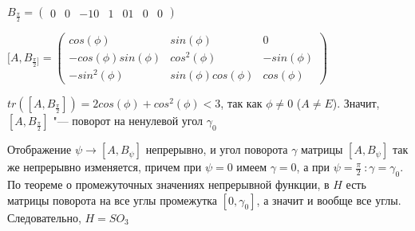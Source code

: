 \documentclass{article}
\begin{document}
$B_{\frac{\pi}{2}} = \begin{pmatrix}
0 & 0 & -1
0 & 1 & 0
1 & 0 & 0
\end{pmatrix}$

$[A, B_{\frac{\pi}{2}]} = \begin{pmatrix}
cos(\phi) & sin(\phi) & 0 \\
-cos(\phi)sin(\phi) & cos^2(\phi) & -sin(\phi) \\
-sin^2(\phi) & sin(\phi)cos(\phi) & cos(\phi)
\end{pmatrix}$

$tr([A, B_{\frac{\pi}{2}}]) = 2cos(\phi) + cos^2(\phi) < 3$, так как $\phi \neq 0$ ($A \neq E$). Значит, $[A, B_{\frac{\pi}{2}}]$ "--- поворот на ненулевой угол $\gamma_0$

Отображение $\psi \rightarrow [A, B_{\psi}]$ непрерывно, и угол поворота $\gamma$ матрицы $[A, B_{\psi}]$ так же непрерывно изменяется, причем при $\psi = 0$ имеем $\gamma = 0$, а при $\psi = \frac{\pi}{2} \ :  \gamma = \gamma_0$. По теореме о промежуточных значениях непрерывной функции, в $H$ есть матрицы поворота на все углы промежутка $[0, \gamma_0]$, а значит и вообще все углы. Следовательно, $H = SO_3$
\end{document}

